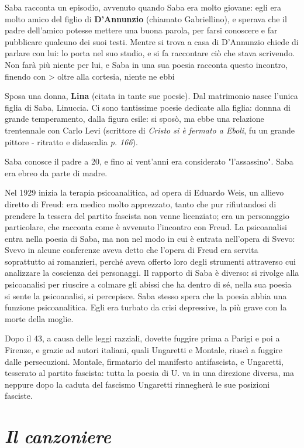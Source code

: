 Saba racconta un episodio, avvenuto quando Saba era molto giovane: egli era molto amico del figlio di \textbf{D'Annunzio} (chiamato Gabriellino), e sperava che il padre dell'amico potesse mettere una buona parola, per farsi conoscere e far pubblicare qualcuno dei suoi testi. 
Mentre si trova a casa di D'Annunzio chiede di parlare con lui: lo porta nel suo studio, e si fa raccontare ciò che stava scrivendo. Non farà più niente per lui, e Saba in una sua poesia racconta questo incontro, finendo con 
> oltre alla cortesia, niente ne ebbi

Sposa una donna, \textbf{Lina} (citata in tante sue poesie). Dal matrimonio nasce l'unica figlia di Saba, Linuccia.
Ci sono tantissime poesie dedicate alla figlia: donnna di grande temperamento, dalla figura esile: si sposò, ma ebbe una relazione trentennale con Carlo Levi (scrittore di \textit{Cristo si è fermato a Eboli}, fu un grande pittore - ritratto e didascalia \emph{p. 166}).


Saba conosce il padre a 20, e fino ai vent'anni era considerato "l'assassino".
Saba era ebreo da parte di madre. 

Nel 1929 inizia la terapia psicoanalitica, ad opera di Eduardo Weis, un allievo diretto di Freud: era medico molto apprezzato, tanto che pur rifiutandosi di prendere la tessera del partito fascista non venne licenziato; era un personaggio particolare, che racconta come è avvenuto l'incontro con Freud. 
La psicoanalisi entra nella poesia di Saba, ma non nel modo in cui è entrata nell'opera di Svevo: Svevo in alcune conferenze aveva detto che l'opera di Freud era servita soprattutto ai romanzieri, perché aveva offerto loro degli strumenti attraverso cui analizzare la coscienza dei personaggi. Il rapporto di Saba è diverso: si rivolge alla psicoanalisi per riuscire a colmare gli abissi che ha dentro di sé, nella sua poesia si sente la psicoanalisi, si percepisce.
Saba stesso spera che la poesia abbia una funzione psicoanalitica. Egli era turbato da crisi depressive, la più grave con la morte della moglie.

Dopo il 43, a causa delle leggi razziali, dovette fuggire prima a Parigi e poi a Firenze, e grazie ad autori italiani, quali Ungaretti e Montale, riuscì a fuggire dalle persecuzioni.
Montale, firmatario del manifesto antifascista, e Ungaretti, tesserato al partito fascista: tutta la poesia di U. va in una direzione diversa, ma neppure dopo la caduta del fascismo Ungaretti rinnegherà le sue posizioni fasciste.

\section{\textit{Il canzoniere}}

